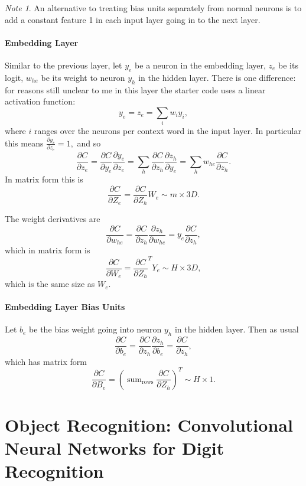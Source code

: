 \documentclass[12pt]{article}
\theoremstyle{plain}
\theoremstyle{definition}
\theoremstyle{remark}
\newtheorem{note}[theorem]{Note}
\DeclareMathOperator*{\sumtext}{sum}
\begin{document}
\begin{note}
An alternative to treating bias units separately from normal neurons is to add a constant feature 1 in each input layer going in to the next layer.
\end{note}

\subsection{Embedding Layer}

Similar to the previous layer, let $y_e$ be a neuron in the embedding layer, $z_e$ be its logit, $w_{he}$ be its weight to neuron $y_h$ in the hidden layer. There is one difference: for reasons still unclear to me in this layer the starter code uses a linear activation function: $$y_e = z_e = \sum_i w_i y_i,$$ where $i$ ranges over the neurons per context word in the input layer. In particular this means $\frac{\partial y_e}{\partial z_e} = 1,$ and so
$$\frac{\partial C}{\partial z_e} = \frac{\partial C}{\partial y_e} \frac{\partial y_e}{\partial z_e} = \sum_h \frac{\partial C}{\partial z_h} \frac{\partial z_h}{\partial y_e} = \sum_h w_{he} \frac{\partial C}{\partial z_h}.$$
In matrix form this is
$$\frac{\partial C}{\partial Z_e} = \frac{\partial C}{\partial Z_h} W_e \sim m \times 3D.$$

The weight derivatives are
$$\frac{\partial C}{\partial w_{he}} = \frac{\partial C}{\partial z_h} \frac{\partial z_h}{\partial w_{he}} = y_e \frac{\partial C}{\partial z_h},$$
which in matrix form is
$$\frac{\partial C}{\partial W_e} = \frac{\partial C}{\partial Z_h}^T Y_e \sim H \times 3D,$$
which is the same size as $W_e.$

\subsection{Embedding Layer Bias Units}

Let $b_e$ be the bias weight going into neuron $y_h$ in the hidden layer. Then as usual
$$\frac{\partial C}{\partial b_e} = \frac{\partial C}{\partial z_h} \frac{\partial z_h}{\partial b_e} = \frac{\partial C}{\partial z_h},$$
which has matrix form
$$\frac{\partial C}{\partial B_e} = \left(\sumtext_{\text{rows}} \frac{\partial C}{\partial Z_h}\right)^T \sim H \times 1.$$

\part{Object Recognition: Convolutional Neural Networks for Digit Recognition}
\end{document}
